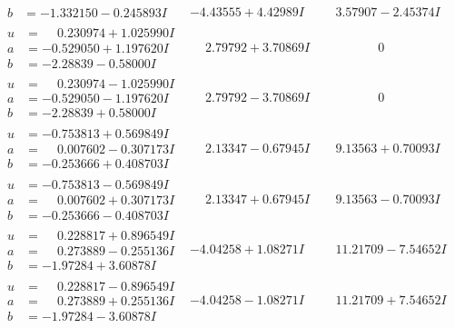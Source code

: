 \documentclass[1p]{elsarticle_modified}
\theoremstyle{definition}
\begin{document}
$$\begin{array}{c|c|c}
\begin{aligned}
b &= -1.332150 - 0.245893 I\end{aligned}
 & -4.43555 + 4.42989 I & \phantom{-}3.57907 - 2.45374 I \\ \hline\begin{aligned}
u &= \phantom{-}0.230974 + 1.025990 I \\
a &= -0.529050 + 1.197620 I \\
b &= -2.28839 - 0.58000 I\end{aligned}
 & \phantom{-}2.79792 + 3.70869 I & \phantom{-0.000000 } 0 \\ \hline\begin{aligned}
u &= \phantom{-}0.230974 - 1.025990 I \\
a &= -0.529050 - 1.197620 I \\
b &= -2.28839 + 0.58000 I\end{aligned}
 & \phantom{-}2.79792 - 3.70869 I & \phantom{-0.000000 } 0 \\ \hline\begin{aligned}
u &= -0.753813 + 0.569849 I \\
a &= \phantom{-}0.007602 - 0.307173 I \\
b &= -0.253666 + 0.408703 I\end{aligned}
 & \phantom{-}2.13347 - 0.67945 I & \phantom{-}9.13563 + 0.70093 I \\ \hline\begin{aligned}
u &= -0.753813 - 0.569849 I \\
a &= \phantom{-}0.007602 + 0.307173 I \\
b &= -0.253666 - 0.408703 I\end{aligned}
 & \phantom{-}2.13347 + 0.67945 I & \phantom{-}9.13563 - 0.70093 I \\ \hline\begin{aligned}
u &= \phantom{-}0.228817 + 0.896549 I \\
a &= \phantom{-}0.273889 - 0.255136 I \\
b &= -1.97284 + 3.60878 I\end{aligned}
 & -4.04258 + 1.08271 I & \phantom{-}11.21709 - 7.54652 I \\ \hline\begin{aligned}
u &= \phantom{-}0.228817 - 0.896549 I \\
a &= \phantom{-}0.273889 + 0.255136 I \\
b &= -1.97284 - 3.60878 I\end{aligned}
 & -4.04258 - 1.08271 I & \phantom{-}11.21709 + 7.54652 I \\ \hline\begin{aligned}

\end{aligned}
\end{array}$$
\end{document}
